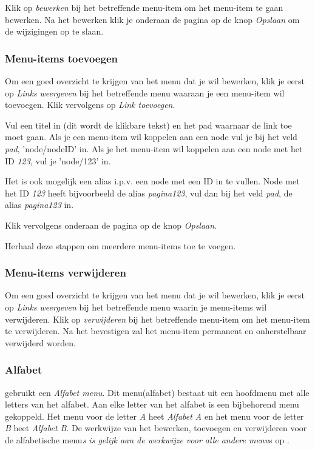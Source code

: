 Klik op \emph{bewerken} bij het betreffende menu-item om het menu-item te gaan bewerken. Na het bewerken klik je onderaan de pagina op de knop \emph{Opslaan} om de wijzigingen op te slaan.


\subsubsection{Menu-items toevoegen}\label{menuitemstoevoegen}

Om een goed overzicht te krijgen van het menu dat je wil bewerken, klik je eerst op \emph{Links weergeven} bij het betreffende menu waaraan je een menu-item wil toevoegen. Klik vervolgens op \emph{Link toevoegen}. 

Vul een titel in (dit wordt de klikbare tekst) en het pad waarnaar de link toe moet gaan. Als je een menu-item wil koppelen aan een node vul je bij het veld \emph{pad}, 'node/nodeID' in. Als je het menu-item wil koppelen aan een node met het ID \emph{123}, vul je 'node/123' in. 

Het is ook mogelijk een alias i.p.v. een node met een ID in te vullen. Node met het ID \emph{123} heeft bijvoorbeeld de alias \emph{pagina123}, vul dan bij het veld \emph{pad}, de alias \emph{pagina123} in. 

Klik vervolgens onderaan de pagina op de knop \emph{Opslaan}.

Herhaal deze stappen om meerdere menu-items toe te voegen.  

\subsubsection{Menu-items verwijderen}\label{menuitemsverwijderen}

Om een goed overzicht te krijgen van het menu dat je wil bewerken, klik je eerst op \emph{Links weergeven} bij het betreffende menu waarin je menu-items wil verwijderen. Klik op \emph{verwijderen} bij het betreffende menu-item om het menu-item te verwijderen. Na het bevestigen zal het menu-item permanent en onherstelbaar verwijderd worden.


\subsubsection{Alfabet}\label{alfabet}

\drupalpath gebruikt een \emph{Alfabet menu}. Dit menu(alfabet) bestaat uit een hoofdmenu met alle letters van het alfabet. Aan elke letter van het alfabet is een bijbehorend menu gekoppeld. Het menu voor de letter \emph{A} heet \emph{Alfabet A} en het menu voor de letter \emph{B} heet \emph{Alfabet B}. De werkwijze van het bewerken, toevoegen en verwijderen voor de alfabetische menu\emph{s is gelijk aan de werkwijze voor alle andere menu}s op \drupalpath{}.

